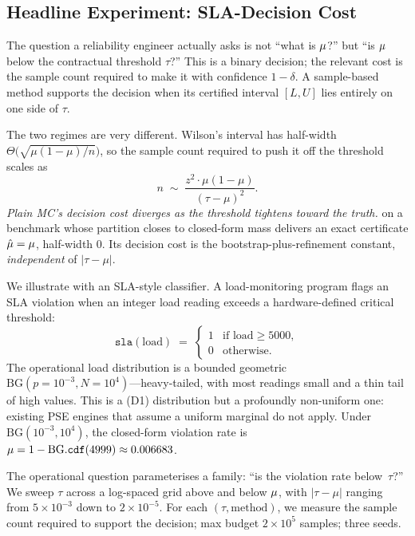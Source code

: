 \subsection{Headline Experiment: SLA-Decision Cost}\label{sec:decision-curve}

The question a reliability engineer actually asks is not ``what is
$\mu$?'' but ``is $\mu$ below the contractual threshold
$\tau$?''  This is a binary decision; the relevant cost is the sample
count required to make it with confidence $1-\delta$.  A sample-based
method supports the decision when its certified interval $[L, U]$
lies entirely on one side of $\tau$.

The two regimes are very different.  Wilson's interval has half-width
$\Theta\!\big(\sqrt{\mu(1-\mu)/n}\big)$, so the sample count required
to push it off the threshold scales as
\begin{equation}\label{eq:wilson-cost}
  n \;\sim\; \frac{z^2 \cdot \mu(1-\mu)}{(\tau - \mu)^2}.
\end{equation}
\emph{Plain MC's decision cost diverges as the threshold tightens
toward the truth.}  \toolname{} on a benchmark whose partition closes
to closed-form mass delivers an exact certificate $\hat\mu = \mu$,
half-width $0$.  Its decision cost is the bootstrap-plus-refinement
constant, \emph{independent} of $|\tau - \mu|$.

We illustrate with an SLA-style classifier.  A load-monitoring
program flags an SLA violation when an integer load reading exceeds
a hardware-defined critical threshold:
\begin{equation}\label{eq:sla-prog}
  \mathtt{sla}(\mathrm{load}) \;=\;
  \begin{cases}
    1 & \text{if } \mathrm{load} \ge 5000,\\
    0 & \text{otherwise.}
  \end{cases}
\end{equation}
The operational load distribution is a bounded geometric
$\mathrm{BG}(p = 10^{-3}, N = 10^4)$---heavy-tailed, with most
readings small and a thin tail of high values.  This is a (D1)
distribution but a profoundly non-uniform one: existing PSE engines
that assume a uniform marginal do not apply.  Under
$\mathrm{BG}(10^{-3}, 10^4)$, the closed-form violation rate is
$\mu = 1 - \mathrm{BG}.\mathtt{cdf}(4999) \approx 0.006683$.

The operational question parameterises a family: ``is the violation
rate below~$\tau$?''  We sweep $\tau$ across a log-spaced grid above
and below $\mu$, with $|\tau - \mu|$ ranging from
$5 \times 10^{-3}$ down to $2 \times 10^{-5}$.  For each
$(\tau, \text{method})$, we measure the sample count required to
support the decision; max budget $2 \times 10^5$ samples; three seeds.

